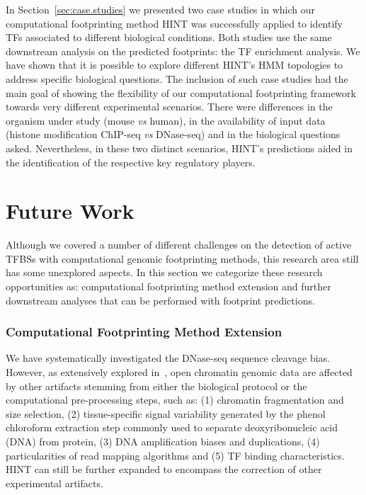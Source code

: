 In Section~\ref{sec:case.studies} we presented two case studies in which our computational footprinting method HINT was successfully applied to identify TFs associated to different biological conditions. Both studies use the same downstream analysis on the predicted footprints: the TF enrichment analysis. We have shown that it is possible to explore different HINT's HMM topologies to address specific biological questions. The inclusion of such case studies had the main goal of showing the flexibility of our computational footprinting framework towards very different experimental scenarios. There were differences in the organism under study (mouse \emph{vs} human), in the availability of input data (histone modification ChIP-seq \emph{vs} DNase-seq) and in the biological questions asked. Nevertheless, in these two distinct scenarios, HINT's predictions aided in the identification of the respective key regulatory players.

\section{Future Work}
\label{sec:future.work}

Although we covered a number of different challenges on the detection of active TFBSs with computational genomic footprinting methods, this research area still has some unexplored aspects. In this section we categorize these research opportunities as: computational footprinting method extension and further downstream analyses that can be performed with footprint predictions.

\subsubsection{Computational Footprinting Method Extension}

We have systematically investigated the DNase-seq sequence cleavage bias. However, as extensively explored in~\cite{meyer2014}, open chromatin genomic data are affected by other artifacts stemming from either the biological protocol or the computational pre-processing steps, such as: (1) chromatin fragmentation and size selection, (2) tissue-specific signal variability generated by the phenol chloroform extraction step commonly used to separate deoxyribonucleic acid (DNA) from protein, (3) DNA amplification biases and duplications, (4) particularities of read mapping algorithms and (5) TF binding characteristics. HINT can still be further expanded to encompass the correction of other experimental artifacts.

